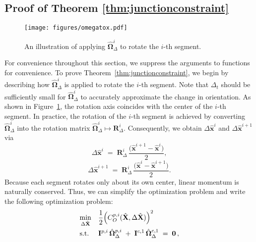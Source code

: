 \subsection{Proof of Theorem \ref{thm:junctionconstraint}}
\label{appendix:theorem_junction2}
\begin{figure}[t]
    \centering
    \texttt{[image: figures/omegatox.pdf]}
    \caption{%
      An illustration of applying 
      \(\hat{\boldsymbol{\Omega}}_{\Delta}^i\)
      to rotate the \(i\)-th segment. 
    }
    \label{fig:orientationonx}
\end{figure}

For convenience throughout this section, we suppress the arguments to functions for convenience.
To prove Theorem~\ref{thm:junctionconstraint}, we begin by describing how 
\(\hat{\boldsymbol{\Omega}}^{i}_{\Delta}\) is applied to rotate the \(i\)-th segment. 
Note that $\Delta_t$ should be sufficiently small for $\hat{\boldsymbol{\Omega}}^i_{\Delta}$ to accurately approximate the change in orientation. 
As shown in Figure~\ref{fig:orientationonx}, the rotation axis coincides with the center of the \(i\)-th segment. 
In practice, the rotation of the \(i\)-th segment is achieved by converting
\(\hat{\boldsymbol{\Omega}}^{ i}_{\Delta}\) into the rotation matrix  \(\hat{\boldsymbol{\Omega}}^{ i}_{\Delta} \mapsto \mathbf{R}^i_\Delta\).
Consequently, we obtain \(\Delta \hat{\mathbf{x}}^i\) and \(\Delta \hat{\mathbf{x}}^{i+1}\) via
\begin{equation}
    \Delta \hat{\mathbf{x}}^i 
    \;=\; 
    \mathbf{R}^i_\Delta \,\frac{\bigl(\hat{\mathbf{x}}^{i+1}-\hat{\mathbf{x}}^{i}\bigr)}{2},
    \label{eq:rx1}
\end{equation}
\begin{equation}
    \Delta \hat{\mathbf{x}}^{i+1} 
    \;=\; 
    \mathbf{R}^i_\Delta \,\frac{\bigl(\hat{\mathbf{x}}^{i}-\hat{\mathbf{x}}^{i+1}\bigr)}{2}.
    \label{eq:rx2}
\end{equation}
Because each segment rotates only about its own center, linear momentum is naturally conserved. 
Thus, we can simplify the optimization problem and write the following optimization problem:
\begin{align}
    \label{eq:appendix_optimization_simplified_attachement}
    & 
    \underset{\Delta \hat{\mathbf{X}}}{\min} 
    && 
    \frac{1}{2}\Bigl(C^{p,i}_O(\hat{\mathbf{X}}, \Delta \hat{\mathbf{X}})\Bigr)^2 
    \\
    &\text{s.t.} 
    && 
    \mathbf{I}^{p, i} \,\hat{\boldsymbol{\Omega}}_{\Delta}^{p, i}  
    \;+\; 
    \mathbf{I}^{c, 1} \,\hat{\boldsymbol{\Omega}}_{\Delta}^{c, 1}  
    \;=\; 
    \mathbf{0}\,,
    \label{eq:appendix_constraint_rigid_body}
\end{align}
